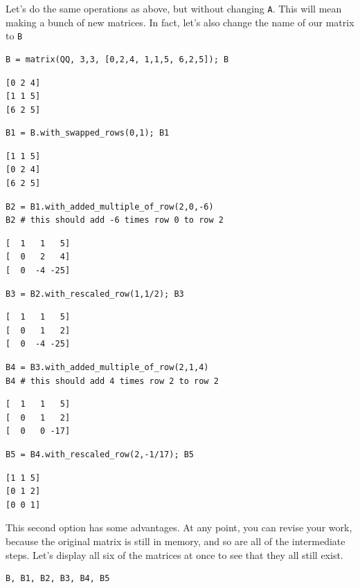 \documentclass[10pt,]{book}
\theoremstyle{plain}
\theoremstyle{definition}
\numberwithin{equation}{section}
\begin{document}
        Let's do the same operations as above, but without changing \verb?A?.
        This will mean making a bunch of new matrices. In fact, let's also change
        the name of our matrix to \verb?B?
\begin{lstlisting}[style=sageinput]
B = matrix(QQ, 3,3, [0,2,4, 1,1,5, 6,2,5]); B
\end{lstlisting}
\begin{lstlisting}[style=sageoutput]
[0 2 4]
[1 1 5]
[6 2 5]
\end{lstlisting}
\begin{lstlisting}[style=sageinput]
B1 = B.with_swapped_rows(0,1); B1
\end{lstlisting}
\begin{lstlisting}[style=sageoutput]
[1 1 5]
[0 2 4]
[6 2 5]
\end{lstlisting}
\begin{lstlisting}[style=sageinput]
B2 = B1.with_added_multiple_of_row(2,0,-6)
B2 # this should add -6 times row 0 to row 2
\end{lstlisting}
\begin{lstlisting}[style=sageoutput]
[  1   1   5]
[  0   2   4]
[  0  -4 -25]
\end{lstlisting}
\begin{lstlisting}[style=sageinput]
B3 = B2.with_rescaled_row(1,1/2); B3
\end{lstlisting}
\begin{lstlisting}[style=sageoutput]
[  1   1   5]
[  0   1   2]
[  0  -4 -25]
\end{lstlisting}
\begin{lstlisting}[style=sageinput]
B4 = B3.with_added_multiple_of_row(2,1,4)
B4 # this should add 4 times row 2 to row 2
\end{lstlisting}
\begin{lstlisting}[style=sageoutput]
[  1   1   5]
[  0   1   2]
[  0   0 -17]
\end{lstlisting}
\begin{lstlisting}[style=sageinput]
B5 = B4.with_rescaled_row(2,-1/17); B5
\end{lstlisting}
\begin{lstlisting}[style=sageoutput]
[1 1 5]
[0 1 2]
[0 0 1]
\end{lstlisting}
\par

        This second option has some advantages. At any point, you can revise your
        work, because the original matrix is still in memory, and so are all of
        the intermediate steps. Let's display all six of the matrices at once to
        see that they all still exist.
\begin{lstlisting}[style=sageinput]
B, B1, B2, B3, B4, B5
\end{lstlisting}
\typeout{************************************************}
\typeout{************************************************}
\end{document}

